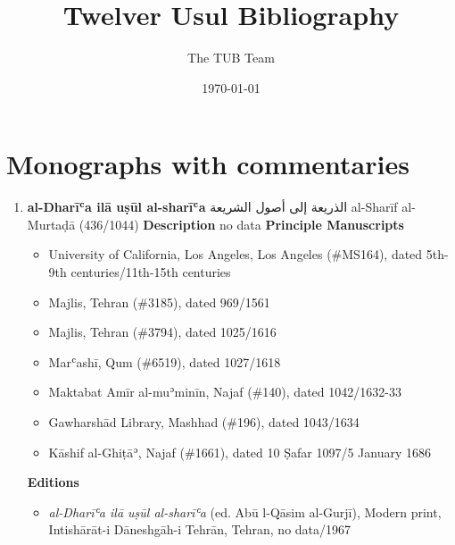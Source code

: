 \documentclass{article}
\title{Twelver Usul Bibliography}
\author{The TUB Team}
\date{\today}
\begin{document}
    \maketitle
    \tableofcontents
    \pagebreak
    \section{Monographs with commentaries}
\begin{enumerate}
      \item \textbf{al-Dharīʿa ilā uṣūl al-sharīʿa}
        \newline
        \textarabic{الذريعة إلى أصول الشريعة}
        \newline
        al-Sharīf al-Murtaḍā
        \newline
        (436/1044)
        \newline
        \newline
        \textbf{Description}
        \newline	
        no data
        \newline
        \newline
    \textbf{Principle Manuscripts}
\begin{itemize}
    \item University of California, Los Angeles, Los Angeles (\#MS164), dated 5th-9th centuries/11th-15th centuries
    
    \item Majlis, Tehran (\#3185), dated 969/1561
    
    \item Majlis, Tehran (\#3794), dated 1025/1616
    
    \item Marʿashī, Qum (\#6519), dated 1027/1618
    
    \item Maktabat Amīr al-muʾminīn, Najaf (\#140), dated 1042/1632-33
    
    \item Gawharshād Library, Mashhad (\#196), dated 1043/1634
    
    \item Kāshif al-Ghiṭāʾ, Najaf (\#1661), dated 10 Ṣafar 1097/5 January 1686
    \end{itemize}
\textbf{Editions}
\begin{itemize}
        \item \emph{al-Dharīʿa ilā uṣūl al-sharīʿa} (ed. Abū l-Qāsim al-Gurjī), Modern print, Intishārāt-i Dāneshgāh-i Tehrān, Tehran, no data/1967
        

\end{itemize}
\end{enumerate}
\end{document}

